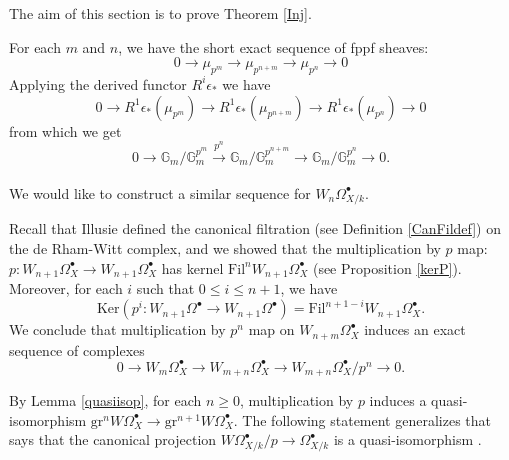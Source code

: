 \documentclass[a4paper,12pt,twoside]{report}
\newcommand{\G}{\mathbb{G}}
\newcommand{\Fil}{\mathrm{Fil}}
\newcommand{\gr}{\mathrm{gr}}
\newcommand{\Ker}{\mathrm{Ker}}
\begin{document}
The aim of this section is to prove Theorem \ref{Inj}.

For each $m$ and $n$, we have the short exact sequence of fppf sheaves:
\[ 0 \rightarrow \mu_{p^m} \rightarrow \mu_{p^{n+m}} \rightarrow \mu_{p^n} \rightarrow 0\]
Applying the derived functor $R^i\epsilon_*$ we have 
\[0\rightarrow R^1\epsilon_*(\mu_{p^m}) \rightarrow R^1\epsilon_*(\mu_{p^{n+m}}) \rightarrow R^1\epsilon_*(\mu_{p^n}) \rightarrow 0\]
from
which we get \[0\rightarrow \G_m/\G_m^{p^m} \xrightarrow[]{p^n} \G_m/\G_m^{p^{n+m}} \rightarrow \G_m/\G_m^{p^n} \rightarrow 0.\] %

We would like to construct a similar sequence for $W_n\Omega_{X/k}^\bullet$. 

Recall that Illusie defined the canonical filtration (see Definition \ref{CanFildef}) on the de Rham-Witt complex, 
and we showed that the multiplication by $p$ map:  $p: W_{n+1}\Omega_X^\bullet\rightarrow W_{n+1}\Omega_X^\bullet$ 
has kernel $\Fil^n W_{n+1}\Omega_X^{\bullet}$ (see Proposition \ref{kerP}). Moreover, for each $i$ such that $0\leqslant i\leqslant n+1$, we have 
\[\Ker(p^i: W_{n+1}\Omega^\bullet\rightarrow W_{n+1}\Omega^\bullet)=\Fil^{n+1-i}W_{n+1}\Omega_X^\bullet.\]
We conclude that multiplication by $p^n$ map on $W_{n+m}\Omega_X^\bullet$ induces an exact sequence of complexes
\[0\rightarrow W_m\Omega_X^\bullet \rightarrow W_{m+n}\Omega_X^\bullet \rightarrow W_{m+n}\Omega_X^\bullet /p^n \rightarrow 0.\]

By Lemma \ref{quasiisop}, for each $n\geqslant 0$, multiplication by $p$ induces a quasi-isomorphism
 $\gr^nW\Omega_X^\bullet \rightarrow \gr^{n+1}W\Omega_X^\bullet$. The following statement generalizes 
\cite[Corollaire I.3.16]{Il1} that says that the canonical projection 
$W\Omega^{\bullet}_{X/k}/p\rightarrow \Omega^{\bullet}_{X/k}$ is a quasi-isomorphism . 
\end{document}
